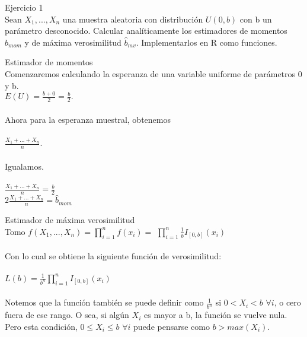 
\begin{section}{Ejercicio 1}
~\\


Sean $X_1, ... ,X_n$ una muestra aleatoria con distribución $U(0, b)$ con b un parámetro desconocido. Calcular analíticamente los estimadores de momentos $\hat{b}_{mom}$ y de máxima verosimilitud $\hat{b}_{mv}$. Implementarlos en R como funciones.


\begin{subsection}{Estimador de momentos}
~\\

Comenzaremos calculando la esperanza de una variable uniforme de parámetros 0 y b.\\
$E(U) = \frac{b+0}{2} = \frac{b}{2}.$\\
~\\

Ahora para la esperanza muestral, obtenemos\\
~\\

$\frac{X_1+ ... +X_n}{n}$. \\
~\\
Igualamos.\\
~\\

  $\frac{X_1+ ... +X_n}{n} = \frac{b}{2}$\\
 $2\frac{X_1+ ... +X_n}{n} = \hat{b}_{mom}$\\
\end{subsection}

\begin{subsection}{Estimador de máxima verosimilitud}
~\\

Tomo $f(X_1, ... ,X_n) = \prod_{i=1}^{n}{f(x_i)} = $ 
$\prod_{i=1}^{n}{\frac{1}{b} I_{[0,b]}(x_i)}$ \\
~\\

Con lo cual se obtiene la siguiente función de verosimilitud:\\
~\\

$L(b) = \frac{1}{b^n} \prod_{i=1}^{n}{ I_{[0,b]}(x_i)}$\\
~\\

Notemos que la función también se puede definir como $\frac{1}{b^n}$ si $0 < X_i < b$ $ \forall i$, o cero fuera de ese rango. O sea, si algún $X_i$ es mayor a b, la función se vuelve nula. \\
Pero esta condición, $0 \leq X_i \leq b$ $ \forall i$ puede pensarse como $ b > max(X_i)$.\\
~\\


\end{subsection}
\end{section}

